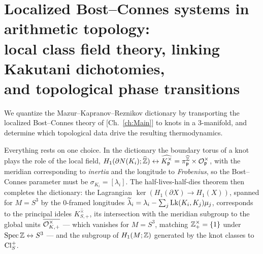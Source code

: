 \chapter[Bost--Connes systems in arithmetic topology]{Localized Bost--Connes systems in arithmetic topology:\\ local class field theory, linking Kakutani dichotomies,\\ and topological phase transitions}\label{ch:VIII}
\begin{summary}
We quantize the Mazur--Kapranov--Reznikov dictionary \cite{Mazur,Kapranov,Reznikov,Morishita}
by transporting the localized Bost--Connes theory of [Ch.~\ref{ch:Main}] to knots in a
$3$-manifold, and determine which topological data drive the resulting thermodynamics.

Everything rests on one choice. In the dictionary the boundary torus of a knot plays the
role of the local field, $H_1(\partial N(K_i);\widehat{\mathbb{Z}})\leftrightarrow\widehat{K_{\mathfrak{p}}^\times}=\pi_{\mathfrak{p}}^{\widehat{\mathbb{Z}}}\times\mathcal{O}_{\mathfrak{p}}^\times$,
with the meridian corresponding to \emph{inertia} and the longitude to \emph{Frobenius}, so
the Bost--Connes parameter must be $\sigma_{K_i}=[\lambda_i]$. The half-lives-half-dies
theorem then completes the dictionary: the Lagrangian $\ker(H_1(\partial X)\to H_1(X))$,
spanned for $M=S^3$ by the $0$-framed longitudes $\widetilde\lambda_i=\lambda_i-\sum_j\operatorname{Lk}(K_i,K_j)\mu_j$,
corresponds to the principal ideles $\overline{K^\times_{S,+}}$, its intersection with the
meridian subgroup to the global units $\overline{\mathcal{O}^\times_{K,+}}$ --- which vanishes for
$M=S^3$, matching $\mathbb{Z}^\times_+=\{1\}$ under $\operatorname{Spec}\mathbb{Z}\leftrightarrow S^3$ --- and the subgroup
of $H_1(M;\mathbb{Z})$ generated by the knot classes to $\operatorname{Cl}^+_S$.


\end{summary}
